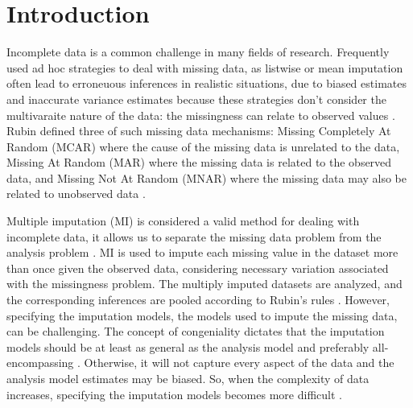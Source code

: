 \documentclass[10pt, a4paper, titlepage]{article}
\begin{document}
\newpage

\section{Introduction}

Incomplete data is a common challenge in many fields of research. Frequently used ad hoc strategies to deal with missing data, as listwise or mean imputation often lead to erroneuous inferences in realistic situations, due to biased estimates and inaccurate variance estimates because these strategies don't consider the multivaraite nature of the data: the missingness can relate to observed values \citep{buurenFlexibleImputationMissing2018, kang2013, enders2017, austin2021}. Rubin defined three of such missing data mechanisms: Missing Completely At Random (MCAR) where the cause of the missing data is unrelated to the data, Missing At Random (MAR) where the missing data is related to the observed data, and Missing Not At Random (MNAR) where the missing data may also be related to unobserved data \citep{rubin1976}.

Multiple imputation (MI) \citep{rubin1987} is considered a valid method for dealing with incomplete data, it allows us to separate the missing data problem from the analysis problem \citep{mistlerComparisonJointModel2017, buurenFlexibleImputationMissing2018, enders2017, burgette2010, austin2021, audigier2018, vanbuuren2007, grund2021, hughes2014}. MI is used to impute each missing value in the dataset more than once given the observed data, considering necessary variation associated with the missingness problem. The multiply imputed datasets are analyzed, and the corresponding inferences are pooled according to Rubin's rules \citep{buurenFlexibleImputationMissing2018, austin2021, rubin1987, carpenter2013}. However, specifying the imputation models, the models used to impute the missing data, can be challenging. The concept of congeniality dictates that the imputation models should be at least as general as the analysis model and preferably all-encompassing \citep{grund2018, enders2018, meng1994multiple, bartlett2015, grund2016}. Otherwise, it will not capture every aspect of the data and the analysis model estimates may be biased. So, when the complexity of data increases, specifying the imputation models becomes more difficult \citep{grund2018, buurenFlexibleImputationMissing2018}.
\end{document}

